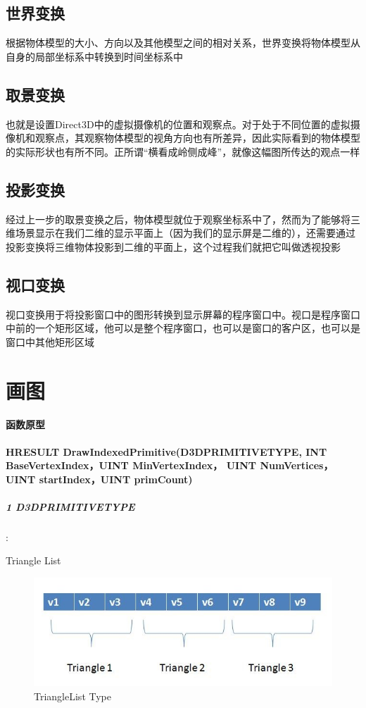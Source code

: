 \documentclass[UTF8,a4paper,8pt]{ctexart}
\begin{document}
	\subsection{世界变换}
		根据物体模型的大小、方向以及其他模型之间的相对关系，世界变换将物体模型从自身的局部坐标系中转换到时间坐标系中
	
	\subsection{取景变换}
		也就是设置Direct3D中的虚拟摄像机的位置和观察点。对于处于不同位置的虚拟摄像机和观察点，其观察物体模型的视角方向也有所差异，因此实际看到的物体模型的实际形状也有所不同。正所谓“横看成岭侧成峰”，就像这幅图所传达的观点一样
	
	\subsection{投影变换}
		经过上一步的取景变换之后，物体模型就位于观察坐标系中了，然而为了能够将三维场景显示在我们二维的显示平面上（因为我们的显示屏是二维的），还需要通过投影变换将三维物体投影到二维的平面上，这个过程我们就把它叫做透视投影
	
	\subsection{视口变换}
		视口变换用于将投影窗口中的图形转换到显示屏幕的程序窗口中。视口是程序窗口中前的一个矩形区域，他可以是整个程序窗口，也可以是窗口的客户区，也可以是窗口中其他矩形区域
\newpage
\section{画图}
		\paragraph{函数原型}\textbf{HRESULT DrawIndexedPrimitive(D3DPRIMITIVETYPE, INT BaseVertexIndex，UINT MinVertexIndex， UINT NumVertices， UINT startIndex，UINT primCount)}
		
			\subparagraph{1 D3DPRIMITIVETYPE}:
			
			Triangle List		
				\begin{figure}[h]
					\centering
					\includegraphics{TriangleList.jpg}
					\caption{TriangleList  Type}
				\end{figure}	
			
\end{document}
